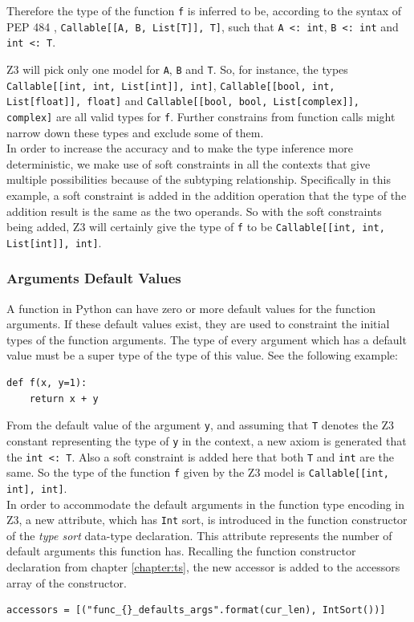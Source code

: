 Therefore the type of the function \lstinline|f| is inferred to be, according to the syntax of PEP 484 \cite{484}, \lstinline|Callable[[A, B, List[T]], T]|, such that \lstinline|A <: int|, \lstinline|B <: int| and \lstinline|int <: T|.

Z3 will pick only one model for \lstinline|A|, \lstinline|B| and \lstinline|T|. So, for instance, the types \lstinline|Callable[[int, int, List[int]], int]|, \lstinline|Callable[[bool, int, List[float]], float]| and \lstinline|Callable[[bool, bool, List[complex]], complex]| are all valid types for \lstinline|f|. Further constrains from function calls might narrow down these types and exclude some of them.\\

In order to increase the accuracy and to make the type inference more deterministic, we make use of soft constraints in all the contexts that give multiple possibilities because of the subtyping relationship. Specifically in this example, a soft constraint is added in the  addition operation that the type of the addition result is the same as the two operands. So with the soft constraints being added, Z3 will certainly give the type of \lstinline|f| to be \lstinline|Callable[[int, int, List[int]], int]|.

\subsubsection{Arguments Default Values}
A function in Python can have zero or more default values for the function arguments. If these default values exist, they are used to constraint the initial types of the function arguments. The type of every argument which has a default value must be a super type of the type of this value. See the following example:

\begin{lstlisting}
def f(x, y=1):
	return x + y
\end{lstlisting}

From the default value of the argument \lstinline|y|, and assuming that \lstinline|T| denotes the Z3 constant representing the type of \lstinline|y| in the context, a new axiom is generated that the \lstinline|int <: T|. Also a soft constraint is added here that both \lstinline|T| and \lstinline|int| are the same. So the type of the function \lstinline|f| given by the Z3 model is \lstinline|Callable[[int, int], int]|.\\

In order to accommodate the default arguments in the function type encoding in Z3, a new attribute, which has \lstinline|Int| sort, is introduced in the function constructor of the \textit{type sort} data-type declaration. This attribute represents the number of default arguments this function has. Recalling the function constructor declaration from chapter \ref{chapter:ts}, the new accessor is added to the accessors array of the constructor.
\begin{lstlisting}
accessors = [("func_{}_defaults_args".format(cur_len), IntSort())]
\end{lstlisting}

